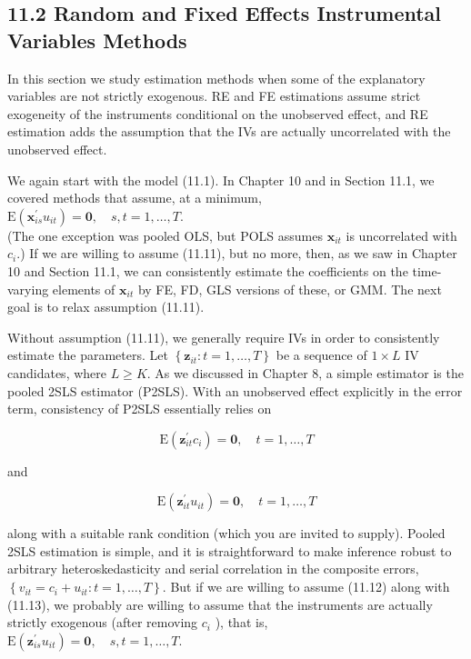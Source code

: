 \documentclass[10pt]{article}
\begin{document}
\subsection*{11.2 Random and Fixed Effects Instrumental Variables Methods}
In this section we study estimation methods when some of the explanatory variables are not strictly exogenous. RE and FE estimations assume strict exogeneity of the instruments conditional on the unobserved effect, and RE estimation adds the assumption that the IVs are actually uncorrelated with the unobserved effect.

We again start with the model (11.1). In Chapter 10 and in Section 11.1, we covered methods that assume, at a minimum,\\
$\mathrm{E}\left(\mathbf{x}_{i s}^{\prime} u_{i t}\right)=\mathbf{0}, \quad s, t=1, \ldots, T$.\\
(The one exception was pooled OLS, but POLS assumes $\mathbf{x}_{i t}$ is uncorrelated with $c_{i}$.) If we are willing to assume (11.11), but no more, then, as we saw in Chapter 10 and Section 11.1, we can consistently estimate the coefficients on the time-varying elements of $\mathbf{x}_{i t}$ by FE, FD, GLS versions of these, or GMM. The next goal is to relax assumption (11.11).

Without assumption (11.11), we generally require IVs in order to consistently estimate the parameters. Let $\left\{\mathbf{z}_{i t}: t=1, \ldots, T\right\}$ be a sequence of $1 \times L$ IV candidates, where $L \geq K$. As we discussed in Chapter 8, a simple estimator is the pooled 2SLS estimator (P2SLS). With an unobserved effect explicitly in the error term, consistency of P2SLS essentially relies on


\begin{equation*}
\mathrm{E}\left(\mathbf{z}_{i t}^{\prime} c_{i}\right)=\mathbf{0}, \quad t=1, \ldots, T \tag{11.12}
\end{equation*}


and


\begin{equation*}
\mathrm{E}\left(\mathbf{z}_{i t}^{\prime} u_{i t}\right)=\mathbf{0}, \quad t=1, \ldots, T \tag{11.13}
\end{equation*}


along with a suitable rank condition (which you are invited to supply). Pooled 2SLS estimation is simple, and it is straightforward to make inference robust to arbitrary heteroskedasticity and serial correlation in the composite errors, $\left\{v_{i t}=c_{i}+u_{i t}: t=1, \ldots, T\right\}$. But if we are willing to assume (11.12) along with (11.13), we probably are willing to assume that the instruments are actually strictly exogenous (after removing $c_{i}$ ), that is,\\
$\mathrm{E}\left(\mathbf{z}_{i s}^{\prime} u_{i t}\right)=\mathbf{0}, \quad s, t=1, \ldots, T$.
\end{document}
